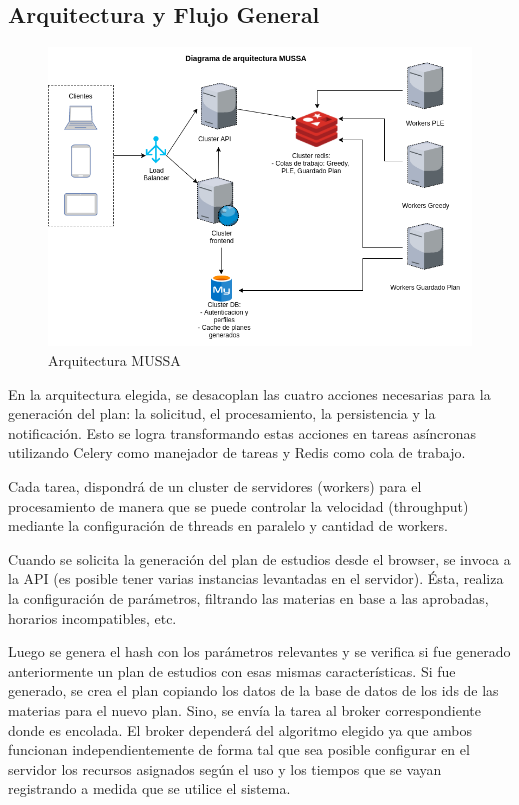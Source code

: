 \documentclass[a4paper]{article}
\begin{document}
\subsection{Arquitectura y Flujo General}

\begin{figure}[H]
\centering
\includegraphics[scale=0.4]{Imagenes/arquitectura.png}\par
\caption{Arquitectura MUSSA}
\end{figure}

En la arquitectura elegida, se desacoplan las cuatro acciones necesarias para la generación del plan: la solicitud, el procesamiento, la persistencia y la notificación. Esto se logra transformando estas acciones en tareas asíncronas utilizando Celery como manejador de tareas y Redis como cola de trabajo.

Cada tarea, dispondrá de un cluster de servidores (workers)  para el procesamiento de manera que se puede controlar la velocidad (throughput) mediante la configuración de threads en paralelo y cantidad de workers.\newline

Cuando se solicita la generación del plan de estudios desde el browser, se invoca a la API (es posible tener varias instancias levantadas en el servidor). Ésta, realiza la configuración de parámetros, filtrando las materias en base a las aprobadas, horarios incompatibles, etc.

Luego se genera el hash con los parámetros relevantes y se verifica si fue generado anteriormente un plan de estudios con esas mismas características. Si fue generado, se crea el plan copiando los datos de la base de datos de los ids de las materias para el nuevo plan. Sino, se envía la tarea al broker correspondiente donde es encolada. El broker dependerá del algoritmo elegido ya que ambos funcionan independientemente de forma tal que sea posible configurar en el servidor los recursos asignados según el uso y los tiempos que se vayan registrando a medida que se utilice el sistema.
\end{document}
